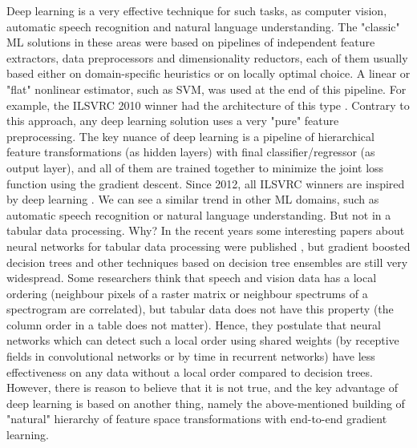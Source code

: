 \documentclass{article}
\begin{document}
Deep learning is a very effective technique for such tasks, as computer vision, automatic speech recognition and natural language understanding. The "classic" ML solutions in these areas were based on pipelines of independent feature extractors, data preprocessors and dimensionality reductors, each of them usually based either on domain-specific heuristics or on locally optimal choice. A linear or "flat" nonlinear estimator, such as SVM, was used at the end of this pipeline. For example, the ILSVRC 2010 winner had the architecture of this type \cite{YangLLZYDCH10}. Contrary to this approach, any deep learning solution uses a very "pure" feature preprocessing. The key nuance of deep learning is a pipeline of hierarchical feature transformations (as hidden layers) with final classifier/regressor (as output layer), and all of them are trained together to minimize the joint loss function using the gradient descent. Since 2012, all ILSVRC winners are inspired by deep learning \cite{Krizhevsky2012}. We can see a similar trend in other ML domains, such as automatic speech recognition or natural language understanding. But not in a tabular data processing. Why? In the recent years some interesting papers about neural networks for tabular data processing were published \cite{Klambauer2017,Buturovic2020,Arik2021tabnet}, but gradient boosted decision trees and other techniques based on decision tree ensembles are still very widespread. Some researchers think that speech and vision data has a local ordering (neighbour pixels of a raster matrix or neighbour spectrums of a spectrogram are correlated), but tabular data does not have this property (the column order in a table does not matter). Hence, they postulate that neural networks which can detect such a local order using shared weights (by receptive fields in convolutional networks or by time in recurrent networks) have less effectiveness on any data without a local order compared to decision trees. However, there is reason to believe that it is not true, and the key advantage of deep learning is based on another thing, namely the above-mentioned building of "natural" hierarchy of feature space transformations with end-to-end gradient learning.
\end{document}
